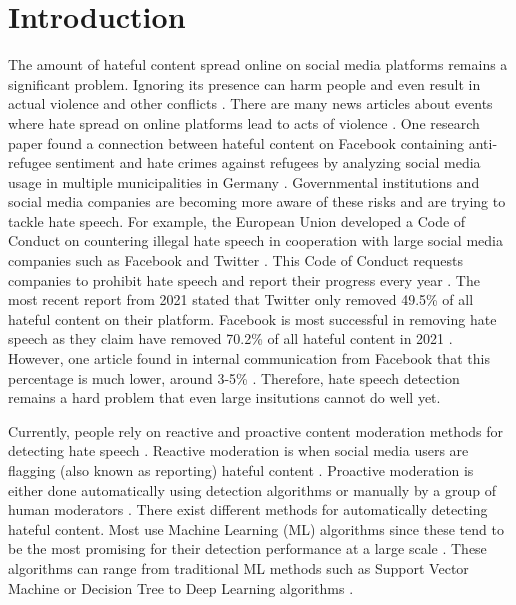 \chapter{Introduction}
\newcommand{\customtextbox}[1]{
	\setlength{\fboxsep}{0.5em}
	\fbox{
		\begin{minipage}{\linewidth-1.7em}
			\vspace*{0.25em}
			#1
		\end{minipage}
	}
}

The amount of hateful content spread online on social media platforms remains a significant problem. Ignoring its presence can harm people and even result in actual violence and other conflicts \cite{ecri-hate-speech-and-violence, balayn2021automatic}. There are many news articles about events where hate spread on online platforms lead to acts of violence \cite{columbia-facebook-linked-to-violence, mujib-mashal-india, paul-mozur-2018, muller2021fanning}. One research paper found a connection between hateful content on Facebook containing anti-refugee sentiment and hate crimes against refugees by analyzing social media usage in multiple municipalities in Germany  \cite{muller2021fanning}. Governmental institutions and social media companies are becoming more aware of these risks and are trying to tackle hate speech. For example, the European Union developed a Code of Conduct on countering illegal hate speech in cooperation with large social media companies such as Facebook and Twitter \cite{eu-code-of-conduct}. This Code of Conduct requests companies to prohibit hate speech and report their progress every year \cite{eu-code-of-conduct}. The most recent report from 2021 stated that Twitter only removed 49.5\% of all hateful content on their platform. Facebook is most successful in removing hate speech as they claim have removed 70.2\% of all hateful content in 2021 \cite{eu-code-of-conduct}. However, one article found in internal communication from Facebook that this percentage is much lower, around 3-5\% \cite{noah2021giansiracusa}. Therefore, hate speech detection remains a hard problem that even large insitutions cannot do well yet.

Currently, people rely on reactive and proactive content moderation methods for detecting hate speech \cite{klonick2017new}. Reactive moderation is when social media users are flagging (also known as reporting) hateful content \cite{klonick2017new}. Proactive moderation is either done automatically using detection algorithms or manually by a group of human moderators \cite{klonick2017new}. There exist different methods for automatically detecting hateful content. Most use Machine Learning (ML) algorithms since these tend to be the most promising for their detection performance at a large scale \cite{balayn2021automatic, fortuna2018survey}. These algorithms can range from traditional ML methods such as Support Vector Machine or Decision Tree to Deep Learning algorithms \cite{fortuna2018survey}.

